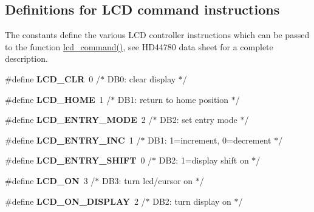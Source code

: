 \subsection*{Definitions for L\+CD command instructions}
\label{_amgrpe1b1604cb195ab970ebf8b6b8b3e322f}%
The constants define the various L\+CD controller instructions which can be passed to the function \hyperlink{group__pfleury__lcd_gaea9d14f02df06f948cb5a56776980826}{lcd\+\_\+command()}, see H\+D44780 data sheet for a complete description. \begin{DoxyCompactItemize}
\item 
\#define {\bfseries L\+C\+D\+\_\+\+C\+LR}~0      /$\ast$ D\+B0\+: clear display                  $\ast$/\hypertarget{group__pfleury__lcd_ga459688213267d13ccfbeb2c9004988cb}{}\label{group__pfleury__lcd_ga459688213267d13ccfbeb2c9004988cb}

\item 
\#define {\bfseries L\+C\+D\+\_\+\+H\+O\+ME}~1      /$\ast$ D\+B1\+: return to home position        $\ast$/\hypertarget{group__pfleury__lcd_gae0e309ccad89222eb3457f2da9f2bb8d}{}\label{group__pfleury__lcd_gae0e309ccad89222eb3457f2da9f2bb8d}

\item 
\#define {\bfseries L\+C\+D\+\_\+\+E\+N\+T\+R\+Y\+\_\+\+M\+O\+DE}~2      /$\ast$ D\+B2\+: set entry mode                 $\ast$/\hypertarget{group__pfleury__lcd_gae5d757ddb6d94de8c82191b60b40e442}{}\label{group__pfleury__lcd_gae5d757ddb6d94de8c82191b60b40e442}

\item 
\#define {\bfseries L\+C\+D\+\_\+\+E\+N\+T\+R\+Y\+\_\+\+I\+NC}~1      /$\ast$   D\+B1\+: 1=increment, 0=decrement     $\ast$/\hypertarget{group__pfleury__lcd_gada766266a0be0d0040fbf86e23b58aa6}{}\label{group__pfleury__lcd_gada766266a0be0d0040fbf86e23b58aa6}

\item 
\#define {\bfseries L\+C\+D\+\_\+\+E\+N\+T\+R\+Y\+\_\+\+S\+H\+I\+FT}~0      /$\ast$   D\+B2\+: 1=display shift on           $\ast$/\hypertarget{group__pfleury__lcd_ga14d0c7fda147e0dc8cdaa4a2629b3532}{}\label{group__pfleury__lcd_ga14d0c7fda147e0dc8cdaa4a2629b3532}

\item 
\#define {\bfseries L\+C\+D\+\_\+\+ON}~3      /$\ast$ D\+B3\+: turn lcd/cursor on             $\ast$/\hypertarget{group__pfleury__lcd_ga47a809dfec086fdeca93dedc4fb83b44}{}\label{group__pfleury__lcd_ga47a809dfec086fdeca93dedc4fb83b44}

\item 
\#define {\bfseries L\+C\+D\+\_\+\+O\+N\+\_\+\+D\+I\+S\+P\+L\+AY}~2      /$\ast$   D\+B2\+: turn display on              $\ast$/\hypertarget{group__pfleury__lcd_gae84f634b0a1661c4d5bbaafd9397732a}{}\label{group__pfleury__lcd_gae84f634b0a1661c4d5bbaafd9397732a}


\end{DoxyCompactItemize}
